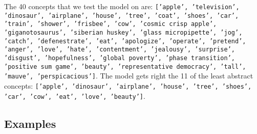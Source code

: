 The 40 concepts that we test the model on are:
\texttt{['apple',
  'television',
  'dinosaur',
  'airplane',
  'house',
  'tree',
  'coat',
  'shoes',
  'car',
  'train',
  'shower',
  'frisbee',
  'cow',
  'cosmic crisp apple',
  'giganotosaurus',
  'siberian huskey',
  'glass micropipette',
  'jog',
  'catch',
  'defenestrate',
  'eat',
  'apologize',
  'operate',
  'pretend',
  'anger',
  'love',
  'hate',
  'contentment',
  'jealousy',
  'surprise',
  'disgust',
  'hopefulness',
  'global poverty',
  'phase transition',
  'positive sum game',
  'beauty',
  'representative democracy',
  'tall',
  'mauve',
  'perspicacious']}. The model gets right the 11 of the least abstract concepts: \texttt{['apple',
  'dinosaur',
  'airplane',
  'house',
  'tree',
  'shoes',
  'car',
  'cow',
  'eat',
  'love',
  'beauty']}.
  
  \subsection{Examples}
  \label{sec:twentyExamples}
  
